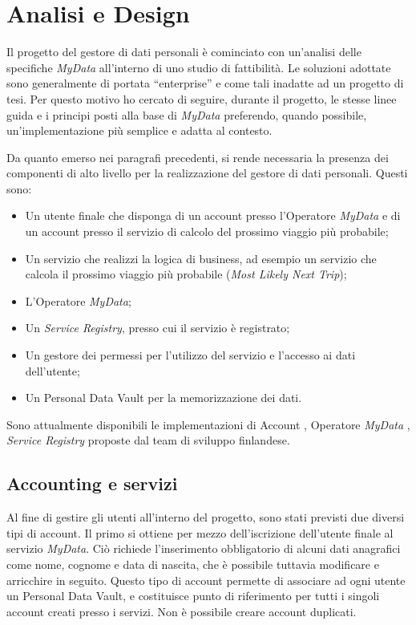 \chapter{Analisi e Design}
\label{capitolo4}
\thispagestyle{empty}

\noindent Il progetto del gestore di dati personali \`e cominciato con un’analisi delle specifiche \textit{MyData} all’interno di uno studio di fattibilit\`a. Le soluzioni adottate sono generalmente di portata “enterprise” e come tali inadatte ad un progetto di tesi. Per questo motivo ho cercato di seguire, durante il progetto, le stesse linee guida e i principi posti alla base di \textit{MyData} preferendo, quando possibile, un'implementazione pi\`u semplice e adatta al contesto.

Da quanto emerso nei paragrafi precedenti, si rende necessaria la presenza dei componenti di alto livello per la realizzazione del gestore di dati personali. Questi sono:
\begin{itemize}
	\item Un utente finale che disponga di un account presso l’Operatore \textit{MyData} e di un account presso il servizio di calcolo del prossimo viaggio pi\`u probabile;
	\item Un servizio che realizzi la logica di business, ad esempio un servizio che calcola il prossimo viaggio pi\`u probabile (\textit{Most Likely Next Trip});
	\item L’Operatore \textit{MyData};
	\item Un \textit{Service Registry}, presso cui il servizio \`e registrato;
	\item Un gestore dei permessi per l’utilizzo del servizio e l’accesso ai dati dell’utente;
	\item Un Personal Data Vault per la memorizzazione dei dati.
\end{itemize}

Sono attualmente disponibili le implementazioni  di Account \cite{githubmydataaccount}, Operatore \textit{MyData} \cite{githubmydataoperator}, \textit{Service Registry} \cite{githubmydataserviceregistry} proposte dal team di sviluppo finlandese.

\section{Accounting e servizi}
Al fine di gestire gli utenti all’interno del progetto, sono stati previsti due diversi tipi di account. Il primo si ottiene per mezzo dell’iscrizione dell’utente finale al servizio \textit{MyData}. Ci\`o richiede l’inserimento obbligatorio di alcuni dati anagrafici come nome, cognome e data di nascita, che \`e possibile tuttavia modificare e arricchire in seguito. Questo tipo di account permette di associare ad ogni utente un Personal Data Vault, e costituisce punto di riferimento per tutti i singoli account creati presso i servizi. Non \`e possibile creare account duplicati.

